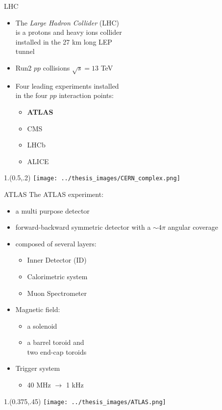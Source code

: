 \documentclass[10pt,UKenglish, leqno, xcolor = dvipsnames]{beamer}
\begin{document}
	\begin{frame}{LHC}
		\vfill
		\begin{itemize}
			\item The \textit{Large Hadron Collider} (LHC) \\is a protons and heavy ions collider\\ installed in the 27 km long LEP \\tunnel
			\item Run2 $pp$ collisions $\sqrt{s} = 13$ TeV
			\item Four leading experiments installed\\ in the four $pp$ interaction points:
			\begin{itemize}
				\item \textbf{ATLAS}
				\item CMS
				\item LHCb
				\item ALICE
			\end{itemize}
		\end{itemize}
		\vfill
		\begin{textblock}{1.}(0.5,.2)
			\texttt{[image: ../thesis\_images/CERN\_complex.png]}
		\end{textblock}
	\end{frame}
	
	\begin{frame}{ATLAS}
		\vfill
		The ATLAS experiment:
		\begin{itemize}
			\item a multi purpose detector
			\item forward-backward symmetric detector with a $\sim4\pi$ angular coverage
			\item composed of several layers:
			\begin{itemize}
				\item Inner Detector (ID)
				\item Calorimetric system
				\item Muon Spectrometer
			\end{itemize}
			\item Magnetic field:
			\begin{itemize}
				\item a solenoid
				\item a barrel toroid and\\ two end-cap toroids
			\end{itemize}
			\item Trigger system
			\begin{itemize}
				\item 40 MHz $\to$ 1 kHz
			\end{itemize}
			
		\end{itemize}
		\vfill
		\begin{textblock}{1.}(0.375,.45)
			\texttt{[image: ../thesis\_images/ATLAS.png]}
		\end{textblock}
	\end{frame}
	
\end{document}
